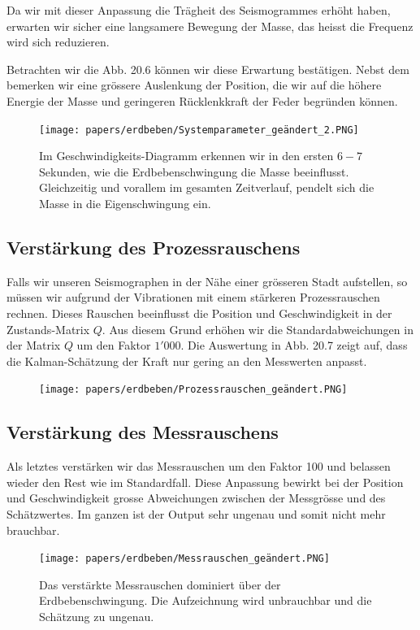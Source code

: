 Da wir mit dieser Anpassung die Trägheit des Seismogrammes erhöht haben, erwarten wir sicher eine langsamere Bewegung der Masse, das heisst die Frequenz wird sich reduzieren.

Betrachten wir die Abb. 20.6 können wir diese Erwartung bestätigen.
Nebst dem bemerken wir eine grössere Auslenkung der Position, die wir auf die höhere Energie der Masse und geringeren Rücklenkkraft der Feder begründen können.

\begin{figure}
	\begin{center}
		\texttt{[image: papers/erdbeben/Systemparameter\_geändert\_2.PNG]}
		\caption{Im Geschwindigkeits-Diagramm erkennen wir in den ersten $6-7$ Sekunden, wie die Erdbebenschwingung die Masse beeinflusst. Gleichzeitig und vorallem im gesamten Zeitverlauf, pendelt sich die Masse in die Eigenschwingung ein.}
	\end{center}
\end{figure}


\subsection{Verstärkung des Prozessrauschens}
Falls wir unseren Seismographen in der Nähe einer grösseren Stadt aufstellen, so müssen wir aufgrund der Vibrationen mit einem stärkeren Prozessrauschen rechnen.
Dieses Rauschen beeinflusst die Position und Geschwindigkeit in der Zustands-Matrix $Q$.
Aus diesem Grund erhöhen wir die Standardabweichungen in der Matrix $Q$ um den Faktor $1'000$.
Die Auswertung in Abb. 20.7 zeigt auf, dass die Kalman-Schätzung der Kraft nur gering an den Messwerten anpasst.

\begin{figure}
	\begin{center}
		\texttt{[image: papers/erdbeben/Prozessrauschen\_geändert.PNG]}
		\caption{}
	\end{center}
\end{figure}

\subsection{Verstärkung des Messrauschens}
Als letztes verstärken wir das Messrauschen um den Faktor 100 und belassen wieder den Rest wie im Standardfall.
Diese Anpassung bewirkt bei der Position und Geschwindigkeit grosse Abweichungen zwischen der Messgrösse und des Schätzwertes.
Im ganzen ist der Output sehr ungenau und somit nicht mehr brauchbar.

\begin{figure}
	\begin{center}
		\texttt{[image: papers/erdbeben/Messrauschen\_geändert.PNG]}
		\caption{Das verstärkte Messrauschen dominiert über der Erdbebenschwingung. Die Aufzeichnung wird unbrauchbar und die Schätzung zu ungenau.}
	\end{center}
\end{figure}

